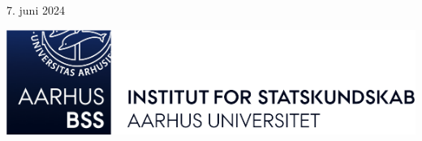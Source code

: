

	\vfill\vfill\vfill\vfill\vfill %

	{\large 7. juni 2024}


	\vfill\vfill
	\includegraphics[width=4\textwidth]{format/images/ifsk-logo-blue.png}\\[1cm] %


	\vfill %

